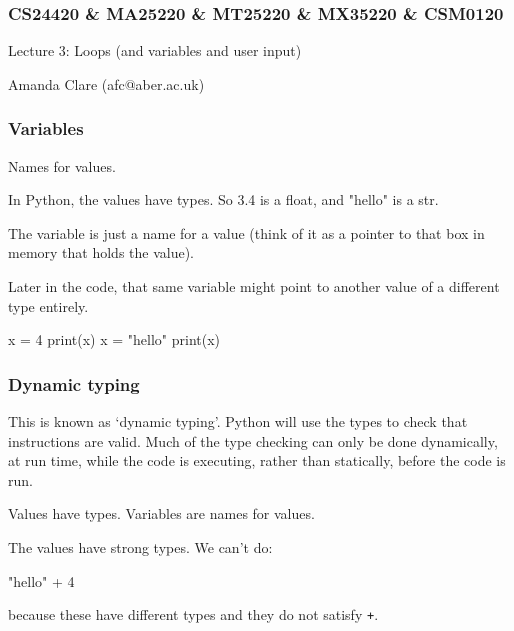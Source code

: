 \documentclass{beamer}
\begin{document}

\begin{frame}
\frametitle{CS24420 \& MA25220 \& MT25220 \& MX35220 \& CSM0120}

\begin{center}
\begin{huge}
Lecture 3: Loops (and variables and user input)
\end{huge}

\bigskip

Amanda Clare (afc@aber.ac.uk)

\end{center}
\end{frame}


\begin{frame}[fragile]
\frametitle{Variables}
Names for values. 

\bigskip

In Python, the values have types. So 3.4 is a float,
and "hello" is a str. 

\bigskip

The variable is just a name for a value (think
of it as a pointer to that box in memory that holds the value). 

\bigskip

Later in the code, that same variable might point to another value of
a different type entirely.

\begin{code}
x = 4
print(x)
x = "hello"
print(x)
\end{code}

\end{frame}



\begin{frame}[fragile]
\frametitle{Dynamic typing}
This is known as `dynamic typing'. Python will use the types to check
that instructions are valid. Much of the type checking can only be done
dynamically, at
run time, while the code is executing, rather than statically, before
the code is run. 
 
\bigskip

Values have types. Variables are names for values.

\bigskip

The values have strong types. We can't do: 
\begin{code}
"hello" + 4

\end{code}

because these have different types and they do not satisfy \texttt{+}.
\end{frame}
\end{document}
